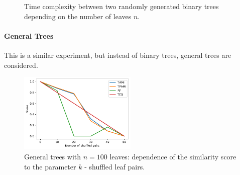 \begin{figure}[H]
	\centering
	\caption{Time complexity between two randomly generated binary trees depending on the number of leaves $n$.}
	\label{fig:binary_tree_shuffled_time_to_n_leaves}
\end{figure}

\paragraph{General Trees}

This is a similar experiment, but instead of binary trees, general trees are considered. 

\begin{figure}[H]
	\begin{center}
		\includegraphics[width=0.5\textwidth]{figures/1-syntatic-trees-general.pdf}
		\caption{General trees with $n=100$ leaves: dependence of the similarity score to the parameter $k$ - shuffled leaf pairs.}
		\label{fig:general_tree_shuffled}
	\end{center}
\end{figure}

